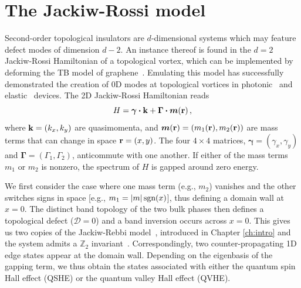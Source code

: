 \section{The Jackiw-Rossi model} 
Second-order topological insulators are $d$-dimensional systems which may feature defect modes of dimension $d-2$. 
An instance thereof is found in the $d=2$ Jackiw-Rossi Hamiltonian of a topological vortex, which can be implemented by deforming the TB model of graphene~\cite{Hou_2007}. Emulating this model has successfully demonstrated the creation of 0D modes at topological vortices in photonic~\cite{Gao_2019, Gao_2020,  Yang_2020} and elastic~\cite{Xiaoxiao_2021} devices. The 2D Jackiw-Rossi Hamiltonian reads
\begin{equation} \label{eq:hoti_H}
H = \boldsymbol{\gamma} \vdot \vb{k} + \boldsymbol{\Gamma} \vdot \boldsymbol{m}(\vb{r})\,,
\end{equation}
where $\vb{k} = (k_x, k_y)$ are quasimomenta, and $\boldsymbol{m}(\vb{r})=(m_1(\vb{r}),m_2(\vb{r}))$ are mass terms that can change in space $\vb{r}=(x,y)$. The four $4 \times 4$ matrices, $\boldsymbol{\gamma} = (\gamma_x, \gamma_y)$ and $\boldsymbol{\Gamma} = (\Gamma_1, \Gamma_2)$, anticommute with one another.
If either of the mass terms $m_1$ or $m_2$ is nonzero, the spectrum of $H$ is gapped around zero energy.


 We first consider the case where one mass term (e.g., $m_2$) vanishes and the other switches signs in space [e.g., $m_1 = \abs{m}\, \text{sgn}(x)$], thus defining a domain wall at $x=0$. The distinct band topology of the two bulk phases then defines a topological defect ($\mathcal{D}=0$) and a band inversion occurs across $x=0$. This gives us two copies of the Jackiw-Rebbi model~\cite{Jackiw_1976, Wu_Hu_2015}, introduced in Chapter \ref{ch:intro} and the system admits a $\mathbb{Z}_2$ invariant~\cite{Kane_2005b, Qi_2008}. Correspondingly, two counter-propagating 1D edge states appear at the domain wall. Depending on the eigenbasis of the gapping term, we thus obtain the states associated with either the quantum spin Hall effect (QSHE) or the quantum valley Hall effect (QVHE).

